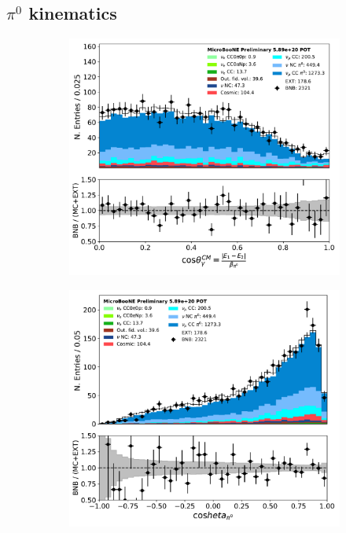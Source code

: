 \subsection{$\pi^0$ kinematics}
\label{app:pi0:kinematics}

\begin{figure}[H] 
\begin{center}
    \begin{subfigure}[b]{0.3\textwidth}
    \centering
    \includegraphics[width=1.00\textwidth]{pi0/kinematics/pi0thetacm_03112020_ALL_scaled.pdf}
    \caption{}
    \end{subfigure}
    \begin{subfigure}[b]{0.3\textwidth}
    \centering
    \includegraphics[width=1.00\textwidth]{pi0/kinematics/pi0momanglecos_03112020_ALL_scaled.pdf}

\end{subfigure}
\end{center}
\end{figure}
